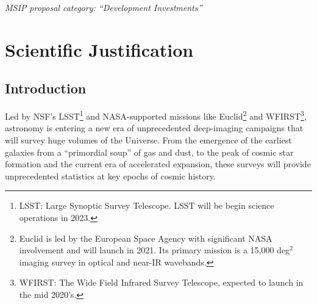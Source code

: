 \documentclass[oneside,11pt]{amsart}
\begin{document}



\setcounter{page}{1}

\centerline{{\it MSIP proposal category: ``Development Investments''}}

\section{Scientific Justification} 

\subsection{Introduction}
Led by NSF's LSST\footnote{
%
LSST: Large Synoptic Survey Telescope.  LSST will be begin science operations in 2023.}
%
and NASA-supported missions like Euclid\footnote{
%
Euclid is led by the European Space Agency with significant NASA involvement and will launch
in 2021. Its primary mission is a 15,000 deg$^2$ imaging survey in optical and near-IR wavebands.} 
%
and WFIRST\footnote{
%
WFIRST: The Wide Field Infrared Survey Telescope, expected to launch in the mid 2020's.},
%
astronomy is entering a new era of unprecedented deep-imaging campaigns that will survey huge volumes of the
Universe.  From the emergence of the earliest galaxies from a ``primordial soup'' of gas and dust, to the peak of
cosmic star formation and the current era of accelerated expansion, these surveys will provide unprecedented statistics
at key epochs of cosmic history.
\end{document}
